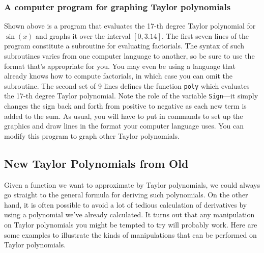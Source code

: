 \subsubsection{A computer program for graphing Taylor polynomials}
Shown above
is a program that evaluates the 17-th degree Taylor polynomial for
$\sin(x)$ and graphs it over the interval $[0, 3.14]$.  The first
seven lines of the program constitute a subroutine for evaluating
factorials.  The syntax of such subroutines varies from one computer
language to another, so be sure to use the format that's appropriate
for you.  You may even be using a language that already knows how to
compute factorials, in which case you can omit the subroutine.  The
second set of 9 lines defines the function {\tt poly} which evaluates
the 17-th degree Taylor polynomial.  Note the role of the variable
{\tt Sign}---it simply changes the sign back and forth from positive
to negative as each new term is added to the sum.  As usual, you will
have to put in commands to set up the graphics and draw lines in the
format your computer language uses.  You can modify this program to
graph other Taylor polynomials.  



\subsection{New Taylor Polynomials from Old}
\label{subsec:new-taylor-polynomials-from-old}

Given a function we want to approximate by Taylor polynomials, we
could always go straight to the general formula for deriving such
polynomials.  On the other hand, it is often possible to avoid a lot
of tedious calculation of derivatives by using a polynomial we've
already calculated. It turns out that any manipulation on Taylor
polynomials you might be tempted to try will probably work.  Here are
some examples to illustrate the kinds of manipulations that can be
performed on Taylor polynomials.

\enlargethispage*{10pt}



